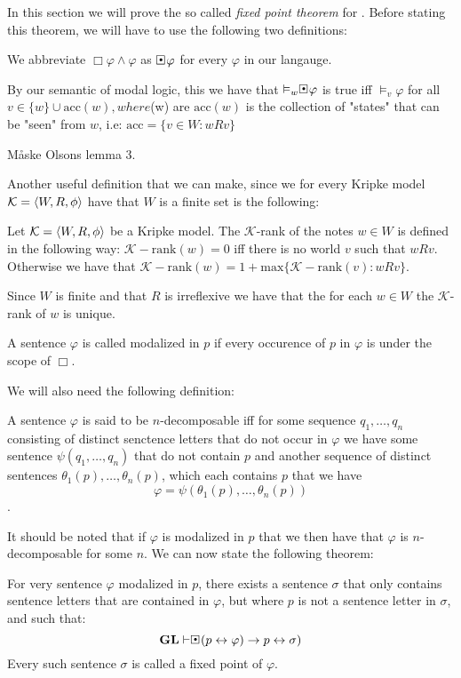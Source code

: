 \documentclass[../main.tex]{subfiles}
\begin{document}
In this section we will prove the so called \textit{fixed point theorem} for
\GL. Before stating this theorem, we will have to use the following two
definitions:

\begin{defi}
	We abbreviate $\Box\varphi\wedge\varphi$ as $\sBox\varphi$ for every
	$\varphi$ in our langauge.
\end{defi}
\begin{remark}
	\label{rem:acc}
By our semantic of modal logic, this we have that $\vDash_w\sBox\varphi$ is true iff $\vDash_v\varphi$
for all $v\in\{w\}\cup\text{acc}(w), where $(w) are $\text{acc}(w)$
is the collection of "states" that can be "seen" from $w$, i.e:
$\text{acc}=\{v\in W:wRv\}$
\end{remark}
\begin{lem}
	Måske Olsons lemma 3.
\end{lem}
Another useful definition that we can make, since we for every Kripke model
$\mathcal{K}=\langle W,R,\phi\rangle$ have that $W$ is a finite set is the following:
\begin{defi}
	Let $\mathcal{K}=\langle W,R,\phi\rangle$ be a Kripke model. The
	$\mathcal{K}$-rank of the notes $w\in W$ is defined in the following
	way: $\mathcal{K}-\text{rank}(w)=0$ iff there is no world $v$ such that
	$wRv$. Otherwise we have that
	$\mathcal{K}-\text{rank}(w)=1+\text{max}\{\mathcal{K}-\text{rank}(v):wRv\}$.
\end{defi}
Since $W$ is finite and that $R$ is irreflexive we have that the for each $w\in
W$ the $\mathcal{K}$-rank of $w$ is unique.
\begin{defi}
	A sentence $\varphi$ is called modalized in $p$ if every occurence of
	$p$ in  $\varphi$ is under the scope of $\Box$.
\end{defi}
We will also need the following definition:
\begin{defi}
	A sentence $\varphi$ is said to be $n$-decomposable iff for some
	sequence $q_1,\ldots,q_n$ consisting of distinct senctence letters that
	do not occur in $\varphi$ we have some sentence $\psi(q_1,\ldots,q_n)$
	that do not contain $p$ and another sequence of distinct sentences 
	$\theta_1(p),\ldots,\theta_n(p)$, which each contains $p$ that we have
	$$\varphi=\psi(\theta_1(p),\ldots,\theta_n(p))$$.
\end{defi}
It should be noted that if $\varphi$ is modalized in $p$ that we then have that
$\varphi$ is $n$-decomposable for some $n$.
We can now state the following theorem:
\begin{thm}
	For very sentence $\varphi$ modalized in $p$, there exists a sentence
	$\sigma$ that only contains sentence letters that are contained in
	$\varphi$, but where $p$ is not a sentence letter in $\sigma$, and such that:
	$$\GL\vdash\sBox(p\leftrightarrow\varphi)\rightarrow p\leftrightarrow\sigma)$$
	Every such sentence $\sigma$ is called a fixed point of $\varphi$.
\end{thm}
\end{document}
